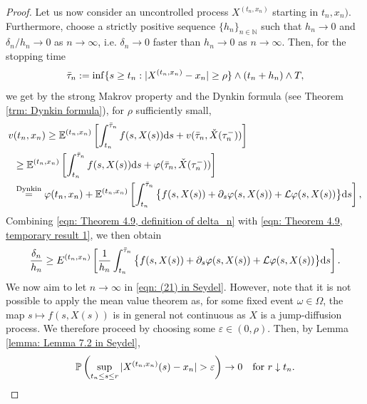 \begin{proof}
    Let us now consider an uncontrolled process $X^{(t_n,x_n)}$ starting in $t_n,x_n)$. Furthermore, choose a strictly positive sequence $\{h_n\}_{n \in \mathbb N}$ such that $h_n \rightarrow 0$ and $\delta_n / h_n \rightarrow 0$ as $n \rightarrow \infty$, i.e. $\delta_n \rightarrow 0$ faster than $h_n \rightarrow 0$ as $n \rightarrow \infty$. Then, for the stopping time
    \begin{equation*}
        \Bar{\tau}_n := \inf \{ s \geq t_n : |X^{(t_n,x_n)} - x_n| \geq \rho\} \wedge (t_n + h_n) \wedge T,
    \end{equation*}
    we get by the strong Makrov property and the Dynkin formula (see Theorem \ref{trm: Dynkin formula}), for $\rho$ sufficiently small,
    \begin{align}
        v & (t_n,x_n) \geq \mathbb{E}^{(t_n,x_n)} \left[ \int_{t_n}^{\Bar{\tau}_n} f(s,X(s)) \mathrm{d} s + v (\bar \tau_n, \check{X}(\tau_n^-)) \right] \nonumber \\
        & \geq \mathbb{E}^{(t_n,x_n)} \left[ \int_{t_n}^{\Bar{\tau}_n} f(s,X(s)) \mathrm{d} s + \varphi(\bar \tau_n, \check{X}(\tau_n^-)) \right] \nonumber \\
        & \overset{\text{Dynkin}}{=} \varphi(t_n,x_n) + \mathbb{E}^{(t_n,x_n)} \left[ \int_{t_n}^{\bar \tau_n} \big\{ f(s,X(s)) + \partial_s\varphi(s,X(s)) + \mathcal L \varphi(s,X(s)) \big\} \mathrm{d} s \right],
        \label{eqn: Theorem 4.9, temporary result 1}
    \end{align}
    Combining \eqref{eqn: Theorem 4.9, definition of delta_n} with \eqref{eqn: Theorem 4.9, temporary result 1}, we then obtain 
    \begin{equation}
        \frac{\delta_n}{h_n} \geq E^{(t_n,x_n)} \left[ \frac{1}{h_n} \int_{t_n}^{\Bar{\tau}_n} \big\{ f(s,X(s)) + \partial_s \varphi(s,X(s)) + \mathcal{L} \varphi(s,X(s)) \big\} \mathrm{d} s \right].
        \label{eqn: (21) in Seydel}
    \end{equation}
    We now aim to let $n \rightarrow \infty$ in \eqref{eqn: (21) in Seydel}. However, note that it is not possible to apply the mean value theorem as, for some fixed event $\omega \in \Omega$, the map $s \mapsto f(s,X(s))$  is in general not continuous as $X$ is a jump-diffusion process. We therefore proceed by choosing some $\varepsilon \in (0, \rho)$. Then, by Lemma \ref{lemma: Lemma 7.2 in Seydel},
    \begin{equation*}
        \Prob \left( \sup_{t_n \leq s \leq r} |X^{(t_n,x_n)}(s) - x_n| > \varepsilon \right) \rightarrow 0 \quad \text{for } r \downarrow t_n. 

\end{equation*}
\end{proof}
